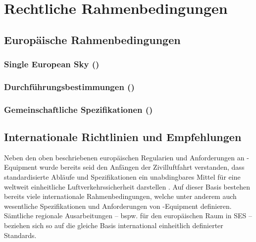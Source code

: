 \chapter{Rechtliche Rahmenbedingungen}

        
\section{Europäische Rahmenbedingungen}
\subsection{Single European Sky ()}
    \label{ch:er}
    
    
\subsection{Durchführungsbestimmungen ()}
    \label{ch:ir}
    
    \pagebreak

\subsection{Gemeinschaftliche Spezifikationen ()}
    \label{ch:cs}
    
    \pagebreak

\section{Internationale Richtlinien und Empfehlungen}
    
    Neben den oben beschriebenen europäischen Regularien und Anforderungen an \atmans-Equipment wurde bereits seid den Anfängen der Zivilluftfahrt verstanden, dass standardisierte Abläufe und Spezifikationen ein unabdingbares Mittel für eine weltweit einheitliche Luftverkehrssicherheit darstellen
    \cite[156]{eu_icao_milde}.
    Auf dieser Basis bestehen bereits viele internationale Rahmenbedingungen, welche unter anderem auch wesentliche Spezifikationen und Anforderungen von \atmans-Equipment definieren.
    Sämtliche regionale Ausarbeitungen -- bspw. für den europäischen Raum in \ac{SES} -- beziehen sich so auf die gleiche Basis international einheitlich definierter Standards.

